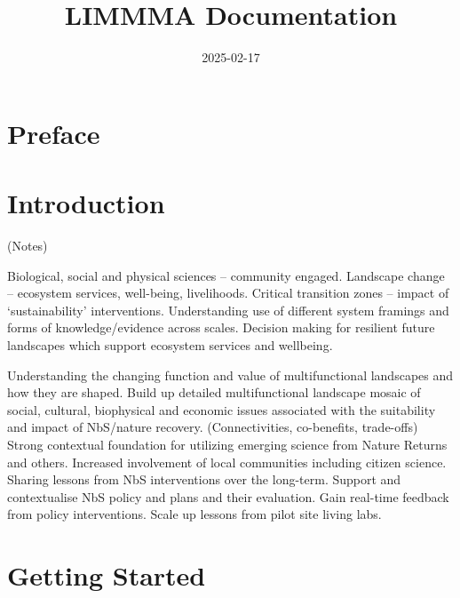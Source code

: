 \documentclass[
  letterpaper,
  DIV=11,
  numbers=noendperiod]{scrreprt}
\title{LIMMMA Documentation}
\author{}
\date{2025-02-17}
\renewcommand*\contentsname{Table of contents}
\newcommand\contentsname{Table of contents}
\begin{document}
\maketitle

\renewcommand*\contentsname{Table of contents}
{
\hypersetup{linkcolor=}
\setcounter{tocdepth}{2}
\tableofcontents
}


\chapter*{Preface}\label{preface}



\chapter*{Introduction}\label{introduction}


(Notes)

Biological, social and physical sciences -- community engaged. Landscape
change -- ecosystem services, well-being, livelihoods. Critical
transition zones -- impact of `sustainability' interventions.
Understanding use of different system framings and forms of
knowledge/evidence across scales. Decision making for resilient future
landscapes which support ecosystem services and wellbeing.

Understanding the changing function and value of multifunctional
landscapes and how they are shaped. Build up detailed multifunctional
landscape mosaic of social, cultural, biophysical and economic issues
associated with the suitability and impact of NbS/nature recovery.
(Connectivities, co-benefits, trade-offs) Strong contextual foundation
for utilizing emerging science from Nature Returns and others. Increased
involvement of local communities including citizen science. Sharing
lessons from NbS interventions over the long-term. Support and
contextualise NbS policy and plans and their evaluation. Gain real-time
feedback from policy interventions. Scale up lessons from pilot site
living labs.


\chapter{Getting Started}\label{getting-started}
\end{document}
